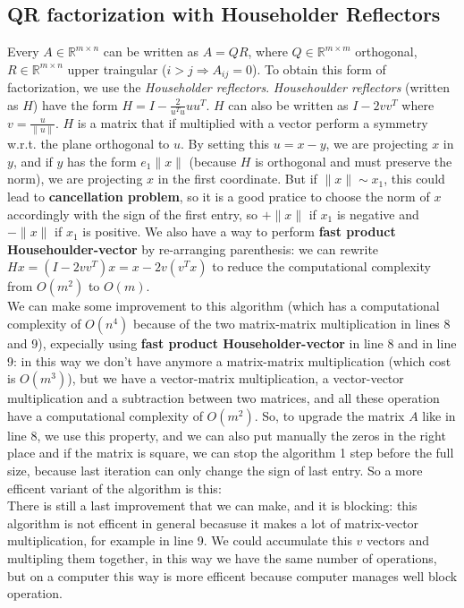 \documentclass{article}
\begin{document}
\subsection{QR factorization with Householder Reflectors}
Every $A \in \mathds{R}^{m \times n}$ can be written as $A = QR$, where $Q \in \mathds{R}^{m \times m}$ orthogonal, $R \in \mathds{R}^{m \times n}$ upper traingular ($i > j \Rightarrow A_{ij} = 0$).
To obtain this form of factorization, we use the \textit{Householder reflectors}.
\textit{Househoulder reflectors} (written as $H$) have the form $H = I - \frac{2}{u^{T}u}uu^{T}$.
$H$ can also be written as $I - 2vv^{T}$ where $v = \frac{u}{\|u\|}$.
$H$ is a matrix that if multiplied with a vector perform a symmetry w.r.t. the plane orthogonal to $u$.
By setting this $u=x-y$, we are projecting $x$ in $y$, and if $y$ has the form $e_{1}\|x\|$ (because $H$ is orthogonal and must preserve the norm), we are projecting $x$ in the first coordinate.
But if $\|x\| \sim x_{1}$, this could lead to \textbf{cancellation problem}, so it is a good pratice to choose the norm of $x$ accordingly with the sign of the first entry, so $+\|x\|$ if $x_{1}$ is negative and $-\|x\|$ if $x_{1}$ is positive.
We also have a way to perform \textbf{fast product Househoulder-vector} by re-arranging parenthesis: we can rewrite $Hx = (I - 2vv^{T})x = x - 2v(v^{T}x)$ to reduce the computational complexity from $O(m^2)$ to $O(m)$.
\\We can make some improvement to this algorithm (which has a computational complexity of $O(n^4)$ because of the two matrix-matrix multiplication in lines 8 and 9), expecially using \textbf{fast product Householder-vector} in line 8 and in line 9: in this way we don't have anymore a matrix-matrix multiplication (which cost is $O(m^3)$), but we have a vector-matrix multiplication, a vector-vector multiplication and a subtraction between two matrices, and all these operation have a computational complexity of $O(m^2)$. So, to upgrade the matrix $A$ like in line 8, we use this property, and we can also put manually the zeros in the right place and if the matrix is square, we can stop the algorithm 1 step before the full size, because last iteration can only change the sign of last entry. So a more efficent variant of the algorithm is this:
\\There is still a last improvement that we can make, and it is blocking: this algorithm is not efficent in general becasuse it makes a lot of matrix-vector multiplication, for example in line 9. We could accumulate this $v$ vectors and multipling them together, in this way we have the same number of operations, but on a computer this way is more efficent because computer manages well block operation.
\end{document}
